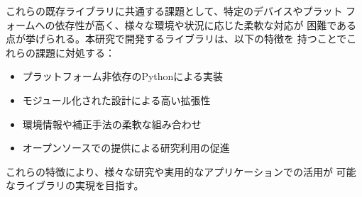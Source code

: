 これらの既存ライブラリに共通する課題として、特定のデバイスやプラット
フォームへの依存性が高く、様々な環境や状況に応じた柔軟な対応が
困難である点が挙げられる。本研究で開発するライブラリは、以下の特徴を
持つことでこれらの課題に対処する：

\begin{itemize}
    \item プラットフォーム非依存のPythonによる実装
    \item モジュール化された設計による高い拡張性
    \item 環境情報や補正手法の柔軟な組み合わせ
    \item オープンソースでの提供による研究利用の促進
\end{itemize}

これらの特徴により、様々な研究や実用的なアプリケーションでの活用が
可能なライブラリの実現を目指す。


